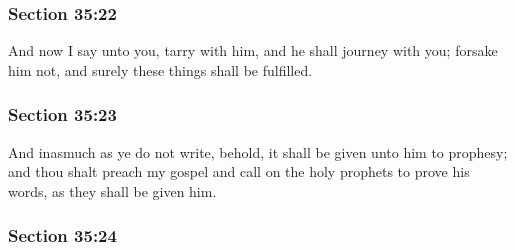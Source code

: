 
	\subsubsection{Section 35:22} %
		\label{DC35-22}

		And now I say unto you, tarry with him, and he shall journey with you; forsake him not, and surely these things shall be fulfilled.


	\subsubsection{Section 35:23} %
		\label{DC35-23}

		And inasmuch as ye do not write, behold, it shall be given unto him to prophesy; and thou shalt preach my gospel and call on the holy prophets to prove his words, as they shall be given him.


	\subsubsection{Section 35:24} %
		\label{DC35-24}

